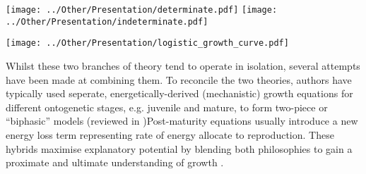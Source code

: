 \documentclass[a4paper]{article} %
\begin{document}
    \begin{center}
        \begin{minipage}{0.48\linewidth}
        \texttt{[image: ../Other/Presentation/determinate.pdf]}
        \label{growth_schedules}
        \texttt{[image: ../Other/Presentation/indeterminate.pdf]}  
        \end{minipage}%
        \hfill
        \begin{minipage}{0.45\linewidth}
            \texttt{[image: ../Other/Presentation/logistic\_growth\_curve.pdf]}  
            \label{logistic_growth}
        \end{minipage}
    \end{center}
    Whilst these two branches of theory tend to operate in isolation, several attempts have been made at combining them. To reconcile the two theories, authors have typically used seperate, energetically-derived (mechanistic) growth equations for different ontogenetic stages, e.g. juvenile and mature, to form two-piece or ``biphasic'' models (reviewed in \cite{Wilson2018})Post-maturity equations usually introduce a new energy loss term representing rate of energy allocate to reproduction. These hybrids maximise explanatory potential by blending both philosophies to gain a proximate and ultimate understanding of growth \autocite{Marshall2019b}.    
\end{document}
